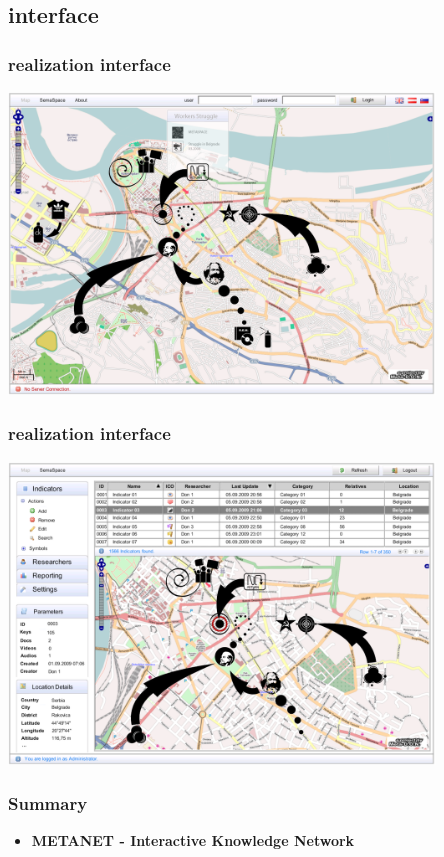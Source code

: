 \documentclass[blue]{beamer}
\begin{document}
\subsection{interface}
\frame
{
\frametitle{\textbf{realization interface}}
\includegraphics[width=0.85\textwidth]{bin/features/metamap/01_gui_metamap_start_update.png}
}

\frame
{
\frametitle{\textbf{realization interface}}
\includegraphics[width=0.85\textwidth]{bin/features/metamap/02_gui_metamap_admin_start_update.png}
}


\frame
{
\frametitle{\textbf{Summary}}
\begin{itemize}
\item \textbf{METANET - Interactive Knowledge Network}
\end{itemize}
}


\end{document}
